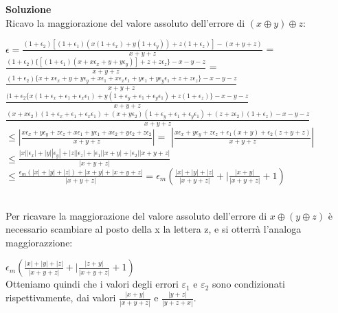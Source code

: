 \large\noindent{}
\begin{flushleft}
	\large \textbf{Soluzione}\\[0.3cm]
	Ricavo la maggiorazione del valore assoluto dell'errore di $(x\oplus y)\oplus z$:\\[0.3cm]
	\begin{Large}$\epsilon = \frac{(1 + \epsilon_{2})[(1+\epsilon_{1})(x(1+\epsilon_{x})+y(1+\epsilon_{y}))+z(1+\epsilon_{z})]-(x+y+z)}{x+y+z}$ = \\[0.3cm]
	$\frac{(1+\epsilon_{2}) \{[(1+ \epsilon_{1})(x+x\epsilon_{x}+y+y\epsilon_{y})]+z+z\epsilon_{z}\}-x-y-z}{x+y+z}$ = \\[0.3cm]
	$\frac{(1+ \epsilon_{2})\{x+x\epsilon_{x}+y+y\epsilon_{y}+x\epsilon_{1}+x\epsilon_{x}\epsilon_{1}+y\epsilon_{1}+y\epsilon_{y}\epsilon_{1}+z+z\epsilon_{z}\}-x-y-z}{x+y+z}$\\[0.3cm]
	$\frac{(1+\epsilon_{2}\{x(1+\epsilon_{x}+\epsilon_{1}+\epsilon_{x}\epsilon_{1})+y(1+\epsilon_{y}+\epsilon_{1}+\epsilon_{y}\epsilon_{1})+z(1+\epsilon_{z})\}-x-y-z}{x+y+z}$\\[0.3cm]
	$\frac{(x+x\epsilon_{2})(1+\epsilon_{x}+\epsilon_{1}+\epsilon_{x}\epsilon_{1})+(x+y\epsilon_{2})(1+\epsilon_{y}+\epsilon_{1}+\epsilon_{y}\epsilon_{1})+(z+z\epsilon_{2})(1+\epsilon_{z})-x-y-z}{x+y+z}$\\[0.3cm]
	$\leq |\frac{x\epsilon_{x}+y\epsilon_{y}+z\epsilon_{z}+x\epsilon_{1}+y\epsilon_{1}+x\epsilon_{2}+y\epsilon_{2}+z\epsilon_{2}}{x+y+z}| =$
	$ |\frac{x\epsilon_{x}+y\epsilon_{y}+z\epsilon_{z}+\epsilon_{1}(x+y)+\epsilon_{2}(z+y+z)}{x+y+z}|$ \\[0.3cm]
	$\leq \frac{|x| |\epsilon_{x}| + |y| |\epsilon_{y} | + |z| |\epsilon_{z}| + |\epsilon_{1}| |x+y| + |\epsilon_{2}| |x+y+z|}{|x+y+z|}$ \\[0.3cm]
	$\leq \frac{\epsilon_{m}(|x|+|y|+|z|)+|x+y|+|x+y+z|}{|x+y+z|} = \epsilon_{m}(\frac{|x|+|y|+|z|}{|x+y+z|}+|\frac{|x+y|}{|x+y+z|}+1)$
	\end{Large}\\[0.3cm]
	Per ricavare la maggiorazione del valore assoluto dell'errore di $x\oplus (y\oplus z)$ è necessario scambiare al posto della x la lettera z, e si otterrà l'analoga maggiorazzione:\\[0.3cm]
	\begin{large}
		$\epsilon_{m}(\frac{|x|+|y|+|z|}{|x+y+z|}+|\frac{|z+y|}{|x+y+z|}+1)$\\[0.3cm]
		Otteniamo quindi che i valori degli errori $\varepsilon_{1}$ e $\varepsilon_{2}$ sono condizionati rispettivamente, dai valori $\frac{|x+y|}{|x+y+z|}$ e $\frac{|y+z|}{|y+z+x|}$.

	\end{large}
\end{flushleft}